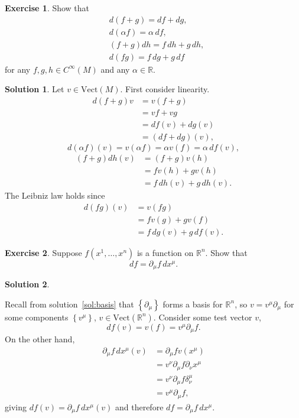 \documentclass[11pt, a4paper]{article}
\theoremstyle{definition}
\newtheorem{ex}{Exercise}[part]
\newtheorem{sol}{Solution}[part]
\begin{document}
\begin{ex}

Show that
\begin{align*}
    & d(f + g) = df + dg, \\
    & d(\alpha f) = \alpha\, df, \\
    & (f + g) dh = f\, dh + g\, dh, \\
    & d(fg) = f \, dg + g\, df
\end{align*}
for any $f, g, h \in C^\infty(M)$ and any $\alpha \in \mathbb{R}$.

\end{ex}

\begin{sol}

Let $v \in \text{Vect}(M)$. First consider linearity.
\begin{align*}
    d(f + g)v &= v(f + g) \\
              &= vf + vg \\
              &= df(v) + dg(v) \\
              &= (df + dg)(v),
\end{align*}
\[
    d(\alpha f)(v) = v(\alpha f) = \alpha v(f) = \alpha \, df(v),
\]
\begin{align*}
    (f + g)dh(v) &= (f + g)v(h) \\
                 &= fv(h) + gv(h) \\
                 &= f\, dh(v) + g \, dh(v).
\end{align*}
The Leibniz law holds since
\begin{align*}
    d(fg)(v) &= v(fg) \\
             &= f v(g) + g v(f) \\
             &= f \, dg(v) + g \, df(v).
\end{align*}

\end{sol}

\begin{ex}

Suppose $f(x^1, \ldots, x^n)$ is a function on $\mathbb{R}^n$. Show that
\[
    df = \partial_\mu f \, dx^\mu.
\]

\end{ex}

\begin{sol}\label{sol:gradient}

Recall from solution~\ref{sol:basis} that $\left\{\partial_\mu\right\}$ forms a basis for $\mathbb{R}^n$, so $v = v^\mu \partial_\mu$ for some components $\left\{v^\mu\right\}$, $v \in \text{Vect}(\mathbb{R}^n)$. Consider some test vector $v$,
\[
    df(v) = v(f) = v^\mu \partial_\mu f.
\]
On the other hand,
\begin{align*}
    \partial_\mu f \, dx^\mu (v) &= \partial_\mu f v(x^\mu) \\
        &= v^\nu \partial_\mu f \partial_\nu x^\mu \\
        &= v^\nu \partial_\mu f \delta_\nu^\mu \\
        &= v^\mu \partial_\mu f,
\end{align*}
giving $df(v) = \partial_\mu f\, dx^\mu(v)$ and therefore $df = \partial_\mu f\, dx^\mu$.

\end{sol}
\end{document}
